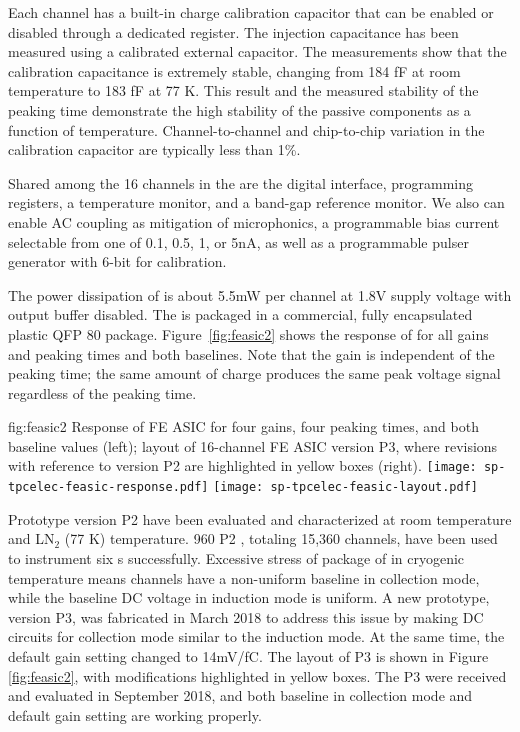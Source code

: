 Each   channel has a built-in charge calibration capacitor that can be enabled or disabled through a dedicated register. The injection capacitance has been measured using a calibrated external capacitor. The measurements show that the calibration capacitance is extremely stable, changing from 184 fF at room temperature to 183 fF at 77 K. This result and the measured stability of the peaking time demonstrate the high stability of the passive components as a function of temperature. Channel-to-channel and chip-to-chip variation in the calibration capacitor are typically less than 1\%.

Shared among the 16 channels in the   are the digital interface, programming registers, a temperature monitor, and a band-gap reference monitor. We also can enable AC coupling as mitigation of microphonics, a programmable bias current selectable from one of 0.1, 0.5, 1, or 5nA, as well as a programmable pulser generator with 6-bit  for calibration. 

The power dissipation of   is about 5.5mW per channel at 1.8V supply voltage with output buffer disabled. The  is packaged in a commercial, fully encapsulated plastic QFP 80 package. Figure~\ref{fig:feasic2} shows the response of   for all gains and peaking times and both baselines. Note that the gain is independent of the peaking time; the same amount of charge produces the same peak voltage signal regardless of the peaking time.

\begin{dunefigure}
{fig:feasic2}
{Response of FE ASIC for four gains, four peaking times, and both baseline values (left); layout of 16-channel FE ASIC version P3, where revisions with reference to version P2 are highlighted in yellow boxes (right).}
\texttt{[image: sp-tpcelec-feasic-response.pdf]}
\hspace{6mm}
\texttt{[image: sp-tpcelec-feasic-layout.pdf]}
\end{dunefigure}

Prototype version P2   have been evaluated and characterized at room temperature and LN$_2$ (77 K) temperature. 960 P2  , totaling 15,360 channels, have been used to instrument six  s successfully. Excessive stress of package of   in cryogenic temperature means  channels have a non-uniform baseline in collection mode, while the baseline DC voltage in induction mode is uniform. A new prototype, version P3, was fabricated in March 2018 to address this issue by making DC circuits for collection mode similar to the induction mode. At the same time, the default gain setting changed to 14mV/fC. The layout of P3   is shown in Figure \ref{fig:feasic2}, with modifications highlighted in yellow boxes. The P3   were received and evaluated in September 2018, and both baseline in collection mode and default gain setting are working properly.

